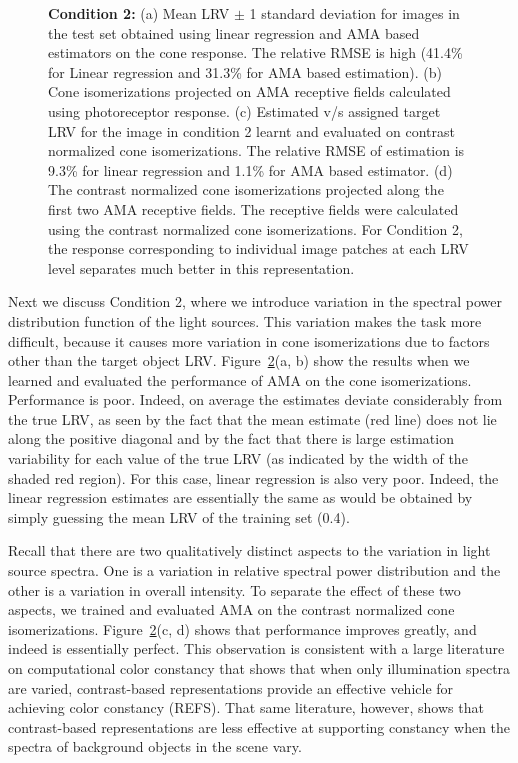 \documentclass{jov}
\begin{document}
\begin{figure}
\begin{subfigure}[b]{0.22 \textwidth}
        \label{fig:case2RFResponseContrast}
    \end{subfigure}
    \caption{{\bf Condition 2:} (a) Mean LRV $\pm$ 1 standard deviation for images in the test set obtained using linear regression and AMA based estimators on the cone response. The relative RMSE is high (41.4\% for Linear regression and 31.3\% for AMA based estimation). (b) Cone isomerizations projected on AMA receptive fields calculated using photoreceptor response. (c) Estimated v/s assigned target LRV for the image in condition 2 learnt and evaluated on contrast normalized cone isomerizations. The relative RMSE of estimation is 9.3\% for linear regression and 1.1\% for AMA based estimator. (d) The contrast normalized cone isomerizations projected along the first two AMA receptive fields. The receptive fields were calculated using the contrast normalized cone isomerizations. For Condition 2, the response corresponding to individual image patches at each LRV level separates much better in this representation.}
\label{fig:Condition2}
\end{figure}

Next we discuss Condition 2, where we introduce variation in the spectral power distribution function of the light sources.
This variation makes the task more difficult, because it causes more variation in cone isomerizations due to factors other than the target object LRV.
Figure~\ref{fig:Condition2}(a, b) show the results when we learned and evaluated the performance of AMA on the cone isomerizations.
Performance is poor.
Indeed, on average the estimates deviate considerably from the true LRV, as seen by the fact that the mean estimate
(red line) does not lie along the positive diagonal and by the fact that there is large estimation variability for each
value of the true LRV (as indicated by the width of the shaded red region).
For this case, linear regression is also very poor. Indeed, the linear regression estimates are essentially the same as would be obtained
by simply guessing the mean LRV of the training set (0.4).

Recall that there are two qualitatively distinct aspects to the variation in light source spectra.
One is a variation in relative spectral power distribution and the
other is a variation in overall intensity.
To separate the effect of these two aspects, we trained and evaluated AMA on the contrast normalized cone isomerizations.
Figure~\ref{fig:Condition2}(c, d) shows that performance improves greatly, and indeed is essentially perfect.
This observation is consistent with a large literature on computational color constancy that shows that when only illumination spectra are varied,
contrast-based representations provide an effective vehicle for achieving color constancy (REFS).
That same literature, however, shows that
contrast-based representations are less effective at supporting constancy when the spectra of background objects in the scene vary.
\end{document}
